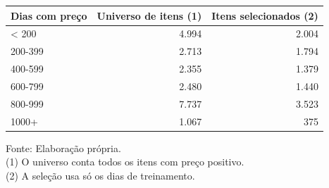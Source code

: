 \begingroup
\setlength{}
\setlength{}
\fontsize{12.0pt}{14.4pt}\selectfont

\setlength{\LTpost}{0mm}
\begin{longtable}{@{\extracolsep{\fill}}lrr}

\toprule
\textbf{Dias com preço} & \textbf{Universo de itens} (1) & \textbf{Itens selecionados} (2) \\ 
\midrule\addlinespace[2.5pt]
\textless{} 200 & 4.994 & 2.004 \\
200-399 & 2.713 & 1.794 \\
400-599 & 2.355 & 1.379 \\
600-799 & 2.480 & 1.440 \\
800-999 & 7.737 & 3.523 \\
1000+ & 1.067 & 375 \\
\bottomrule
\end{longtable}
\begin{minipage}{\linewidth}
Fonte: Elaboração própria.\\
(1) O universo conta todos os itens com preço positivo.\\
(2) A seleção usa só os dias de treinamento.\\
\end{minipage}
\endgroup
